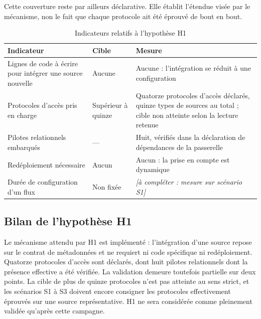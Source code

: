 Cette couverture reste par ailleurs déclarative. Elle établit l'étendue visée par
le mécanisme, non le fait que chaque protocole ait été éprouvé de bout en bout.



\begin{table}[htbp]
\centering
\caption{Indicateurs relatifs à l'hypothèse H1}
\label{tab:res-h1}
\small
\begin{tabularx}{\textwidth}{|p{4.6cm}|p{2.6cm}|X|}
\hline
\textbf{Indicateur} & \textbf{Cible} & \textbf{Mesure} \\ \hline

Lignes de code à écrire pour intégrer une source nouvelle & Aucune & Aucune :
l'intégration se réduit à une configuration \\ \hline
Protocoles d'accès pris en charge & Supérieur à quinze & Quatorze protocoles
d'accès déclarés, quinze types de sources au total ; cible non atteinte selon la
lecture retenue \\ \hline
Pilotes relationnels embarqués & --- & Huit, vérifiés dans la déclaration de
dépendances de la passerelle \\ \hline
Redéploiement nécessaire & Aucun & Aucun : la prise en compte est dynamique \\ \hline
Durée de configuration d'un flux & Non fixée & \emph{[à compléter : mesure sur
scénario S1]} \\ \hline

\end{tabularx}
\end{table}



\subsection{Bilan de l'hypothèse H1}

Le mécanisme attendu par H1 est implémenté : l'intégration d'une source repose sur
le contrat de métadonnées et ne requiert ni code spécifique ni redéploiement.
Quatorze protocoles d'accès sont déclarés, dont huit pilotes relationnels dont la
présence effective a été vérifiée. La validation demeure toutefois partielle sur
deux points. La cible de plus de quinze protocoles n'est pas atteinte au sens
strict, et les scénarios S1 à S3 doivent encore consigner les protocoles
effectivement éprouvés sur une source représentative. H1 ne sera considérée comme
pleinement validée qu'après cette campagne.


